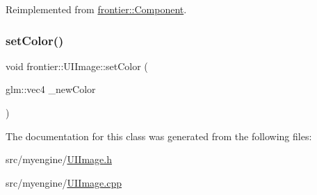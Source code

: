 Reimplemented from \hyperlink{classfrontier_1_1_component_ab920f9bc07ce051ebb5559c5a66508d1}{frontier\+::\+Component}.

\mbox{\label{classfrontier_1_1_u_i_image_ab5b455c9e918f3d2c471b18603973506}} 
\subsubsection{\texorpdfstring{set\+Color()}{setColor()}}
{\footnotesize\ttfamily void frontier\+::\+U\+I\+Image\+::set\+Color (\begin{DoxyParamCaption}\item[{glm\+::vec4}]{\+\_\+new\+Color }\end{DoxyParamCaption})}



The documentation for this class was generated from the following files\+:\begin{DoxyCompactItemize}
\item 
src/myengine/\hyperlink{_u_i_image_8h}{U\+I\+Image.\+h}\item 
src/myengine/\hyperlink{_u_i_image_8cpp}{U\+I\+Image.\+cpp}\end{DoxyCompactItemize}
